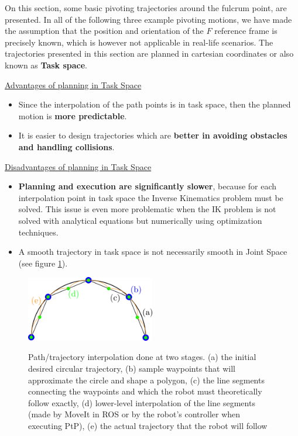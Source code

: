 On this section, some basic pivoting trajectories around the fulcrum point, are presented. In all of the following three example pivoting motions, we have made 
the assumption that the position and orientation of the ${F}$ reference frame is precisely known, which is however not applicable in real-life scenarios. The trajectories 
presented in this section are planned in cartesian coordinates or also known as \textbf{Task space}.

\underline{Advantages of planning in Task Space}
\begin{itemize}
\item Since the interpolation of the path points is in task space, then the planned motion is \textbf{more predictable}.
\item It is easier to design trajectories which are \textbf{better in avoiding obstacles and handling collisions}.
\end{itemize}

\underline{Disadvantages of planning in Task Space}
\begin{itemize}
\item \textbf{Planning and execution are significantly slower}, because for each interpolation point in task space the Inverse Kinematics problem must be solved. This issue is
even more problematic when the IK problem is not solved with analytical equations but numerically using optimization techniques.
\item A smooth trajectory in task space is not necessarily smooth in Joint Space (see figure \ref{interpolation-accuracy}).
\end{itemize}

\begin{center}
\begin{figure}[htbp]
\centering
\includegraphics[width=0.5\textwidth]{images/interpolation-accuracy.png}\\
\caption{Path/trajectory interpolation done at two stages. (a) the initial desired circular trajectory, (b) sample waypoints that will approximate the circle and shape a polygon, (c) the line segments connecting the 
waypoints and which the robot must theoretically follow exactly, (d) lower-level interpolation of the line segments (made by MoveIt in ROS or by the robot's controller when executing PtP), (e) the actual trajectory that 
the robot will follow}
\label{interpolation-accuracy}
\end{figure}
\end{center}



